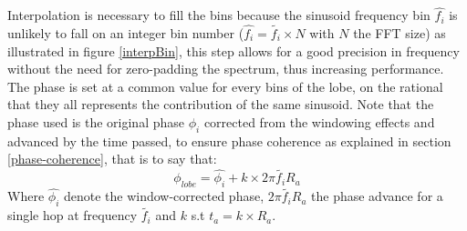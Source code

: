 \documentclass[]{article}
\begin{document}
Interpolation is necessary to fill the bins because the sinusoid frequency bin $\hat{f_i}$ is unlikely to fall on an integer bin number ($\hat{f_i} = \tilde{f_i}\times N$ with $N$ the FFT size) as illustrated in figure \ref{interpBin}, this step allows for a good precision in frequency without the need for zero-padding the spectrum, thus increasing performance.\\
The phase is set at a common value for every bins of the lobe, on the rational that they all represents the contribution of the same sinusoid. Note that the phase used is the original phase $\phi_{i}$ corrected from the windowing effects and advanced by the time passed, to ensure phase coherence as explained in section \ref{phase-coherence}, that is to say that:
\begin{equation}\label{statPhaseShift}
\phi_{lobe} = \hat{\phi_{i}} + k\times 2\pi \tilde{f_i} R_a
\end{equation}
Where $\hat{\phi_{i}}$ denote the window-corrected phase, $2\pi \tilde{f_i} R_a$ the phase advance for a single hop at frequency $\tilde{f_i}$ and $k$ s.t $t_a = k\times R_a$.
\end{document}
